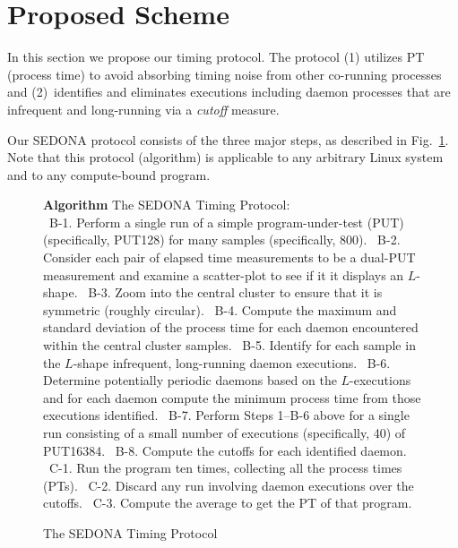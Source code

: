 \documentclass[letter]{ieice}
\begin{document}
\section{Proposed Scheme}
\label{sec:prop_appach}

{\color{blue}
In this section we propose our timing protocol. 
The protocol (1) utilizes PT (process time) to avoid absorbing timing noise from other co-running processes and (2)~identifies and eliminates executions including daemon processes that are infrequent and \hbox{long-running} via a {\em cutoff} measure. 

Our SEDONA protocol consists of the three major steps, as described in Fig.~\ref{alg:find}. 
Note that this protocol (algorithm) is applicable to any arbitrary Linux system and to any compute-bound program.
}

\vspace{-0.2in}
\begin{figure}[h]
\begin{center}
\begin{algorithmic}
{\bf Algorithm} The SEDONA Timing Protocol: \\
{\color{blue}
\STATE  \ B-1. Perform a single run of a simple program-under-test (PUT) (specifically, PUT128) for many samples (specifically, 800).
\STATE  \ B-2. Consider each pair of elapsed time measurements to be a dual-PUT measurement and examine a scatter-plot to see if it it displays an $L$-shape.
\STATE  \ B-3. Zoom into the central cluster to ensure that it is symmetric (roughly circular).
\STATE  \ B-4. Compute the maximum and standard deviation of the process time for each daemon encountered within the central cluster samples.
\STATE  \ B-5. Identify for each sample in the $L$-shape infrequent, \hbox{long-running} daemon executions. 
\STATE  \ B-6. Determine potentially periodic daemons based on the \hbox{$L$-executions} and for each daemon compute the minimum process time from those executions identified. 
\STATE  \ B-7. Perform Steps 1--B-6 above for a single run consisting of a small number of executions (specifically, 40) of PUT16384.  
\STATE  \ B-8. Compute the cutoffs for each identified daemon. 
\STATE  \ C-1. Run the program ten times, collecting all the process times (PTs). 
\STATE  \ C-2. Discard any run involving daemon executions over the cutoffs.
\STATE  \ C-3. Compute the average to get the PT of that program.
}
\end{algorithmic}
\end{center}
\vspace{-0.05in}
\caption{The SEDONA Timing Protocol\label{alg:find}}
\vspace{-0.2in}
\end{figure}
\end{document}
